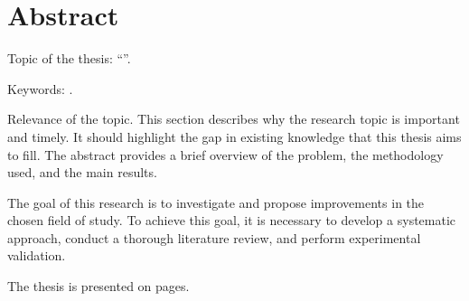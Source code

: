 \section*{Abstract}

Topic of the thesis: \enquote{\ThesisTitle}.

Keywords: \ThesisKeywords.

Relevance of the topic.
This section describes why the research topic is important and timely.
It should highlight the gap in existing knowledge that this thesis aims to fill.
The abstract provides a brief overview of the problem, the methodology used, and the main results.

The goal of this research is to investigate and propose improvements in the chosen field of study.
To achieve this goal, it is necessary to develop a systematic approach, conduct a thorough literature review, and perform experimental validation.

The thesis is presented on \pageref{LastPage} pages.
